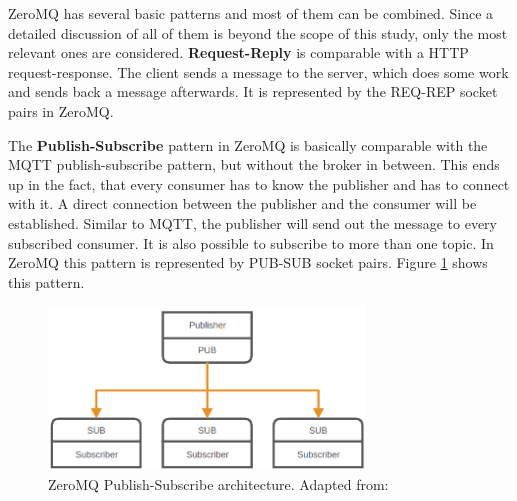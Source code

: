 ZeroMQ has several basic patterns and most of them can be combined.
Since a detailed discussion of all of them is beyond the scope of this study, only the most relevant ones are considered.\newline
\textbf{Request-Reply} is comparable with a \ac{HTTP} request-response.
The client sends a message to the server, which does some work and sends back a message afterwards.
It is represented by the REQ-REP socket pairs in ZeroMQ.\newline

The \textbf{Publish-Subscribe} pattern in ZeroMQ is basically comparable with the MQTT publish-subscribe pattern, but without the broker in between.
This ends up in the fact, that every consumer has to know the publisher and has to connect with it.
A direct connection between the publisher and the consumer will be established.
Similar to MQTT, the publisher will send out the message to every subscribed consumer.
It is also possible to subscribe to more than one topic.
In ZeroMQ this pattern is represented by PUB-SUB socket pairs.
Figure \ref{fig:zeromq_pub_sub} shows this pattern.

\begin{figure}[H]
    \centering
    \includegraphics[width=0.75\textwidth]{resources/images/zeromq-pub-sub.png}
    \caption[ZeroMQ Publish-Subscribe architecture]{ZeroMQ Publish-Subscribe architecture. Adapted from: \autocite{ZeroMQ:Guide}}
    \label{fig:zeromq_pub_sub}
\end{figure}

